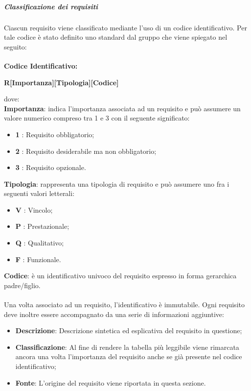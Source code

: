             \subparagraph{Classificazione dei requisiti} \label{subparagraph:Classificazione dei requisiti}
            Ciascun requisito viene classificato mediante l'uso di un codice identificativo. Per tale codice è stato definito uno standard dal gruppo che viene spiegato nel seguito:\\\\
            \textbf{Codice Identificativo:}\\
            \begin{center}
                \textbf{\Large{R[Importanza][Tipologia][Codice]}}
            \end{center}
            dove:\\

            \textbf{Importanza}: indica l'importanza associata ad un requisito e può assumere un valore numerico compreso tra 1 e 3 con il seguente significato:
                \begin{itemize}[label={}]
                    \item \textbf{1} : Requisito obbligatorio;
                    \item \textbf{2} : Requisito desiderabile ma non obbligatorio;
                    \item \textbf{3} : Requisito opzionale.
                \end{itemize}

            \textbf{Tipologia}: rappresenta una tipologia di requisito e può assumere uno fra i seguenti valori letterali:
            \begin{itemize}[label={}]
                \item \textbf{V} : Vincolo;
                \item \textbf{P} : Prestazionale;
                \item \textbf{Q} : Qualitativo;
                \item \textbf{F} : Funzionale.
            \end{itemize}

            \textbf{Codice}: è un identificativo univoco del requisito espresso in forma gerarchica padre/figlio.
            \\
            \\
            Una volta associato ad un requisito, l'identificativo è immutabile.
            Ogni requisito deve inoltre essere accompagnato da una serie di informazioni aggiuntive:
            \begin{itemize}
                \item \textbf{Descrizione}: Descrizione sintetica ed esplicativa del requisito in questione;
                \item \textbf{Classificazione}: Al fine di rendere la tabella più leggibile viene rimarcata ancora una volta l'importanza del requisito anche se già presente nel codice identificativo;
                \item \textbf{Fonte}: L'origine del requisito viene riportata in questa sezione.
            \end{itemize}
            
